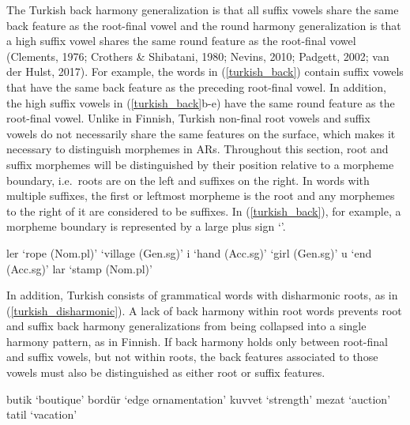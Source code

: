 \documentclass[,doc,floatsintext]{apa6}
\theoremstyle{definition}
\theoremstyle{definition}
\theoremstyle{definition}
\theoremstyle{remark}
\begin{document}
The Turkish back harmony generalization is that all suffix vowels share
the same back feature as the root-final vowel and the round harmony
generalization is that a high suffix vowel shares the same round feature
as the root-final vowel (Clements, 1976; Crothers \& Shibatani, 1980;
Nevins, 2010; Padgett, 2002; van der Hulst, 2017). For example, the
words in (\ref{turkish_back}) contain suffix vowels that have the same
back feature as the preceding root-final vowel. In addition, the high
suffix vowels in (\ref{turkish_back}b-e) have the same round feature as
the root-final vowel. Unlike in Finnish, Turkish non-final root vowels
and suffix vowels do not necessarily share the same features on the
surface, which makes it necessary to distinguish morphemes in ARs.
Throughout this section, root and suffix morphemes will be distinguished
by their position relative to a morpheme boundary, i.e.~roots are on the
left and suffixes on the right. In words with multiple suffixes, the
first or leftmost morpheme is the root and any morphemes to the right of
it are considered to be suffixes. In (\ref{turkish_back}), for example,
a morpheme boundary is represented by a large plus sign
`\textipa{\LARGE+}'.

\begin{exe}
\label{turkish_back} 
\begin{xlist}
  \ex {}ler `rope (Nom.pl)'
  \ex {} `village (Gen.sg)'
  \ex {}i   `hand (Acc.sg)'
  \ex {} `girl (Gen.sg)'
  \ex {}u  `end (Acc.sg)'
  \ex {}lar `stamp (Nom.pl)'
\end{xlist}
\end{exe}

In addition, Turkish consists of grammatical words with disharmonic
roots, as in (\ref{turkish_disharmonic}). A lack of back harmony within
root words prevents root and suffix back harmony generalizations from
being collapsed into a single harmony pattern, as in Finnish. If back
harmony holds only between root-final and suffix vowels, but not within
roots, the back features associated to those vowels must also be
distinguished as either root or suffix features.

\begin{exe}
\label{turkish_disharmonic} 
\begin{xlist}
  \ex butik   `boutique'
  \ex bordür  `edge ornamentation'
  \ex kuvvet  `strength'
  \ex mezat   `auction'
  \ex tatil   `vacation'
\end{xlist}
\end{exe}
\end{document}

